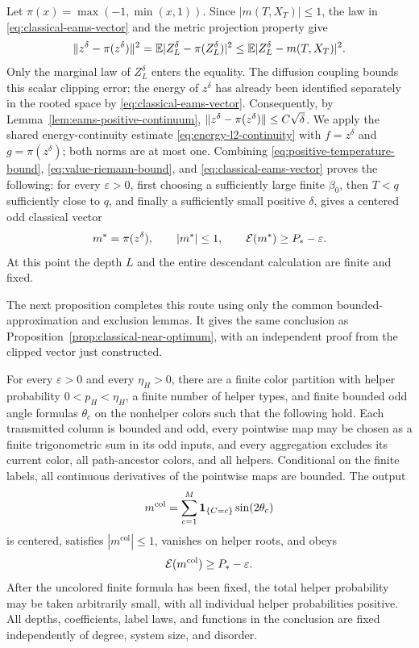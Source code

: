 Let $\pi(x)=\max(-1,\min(x,1))$.  Since $|m(T,X_T)|\le1$,
the law in \eqref{eq:classical-eams-vector} and the metric projection
property give
\[
 \lVert z^\delta-\pi(z^\delta)\rVert^2
 =\mathbb E|Z^\delta_L-\pi(Z^\delta_L)|^2
 \le\mathbb E|Z^\delta_L-m(T,X_T)|^2.
\]
Only the marginal law of $Z^\delta_L$ enters the equality. The
diffusion coupling bounds this scalar clipping error; the energy of
$z^\delta$ has already been identified separately in the rooted space
by \eqref{eq:classical-eams-vector}.
Consequently, by Lemma~\ref{lem:eams-positive-continuum},
$\lVert z^\delta-\pi(z^\delta)\rVert\le C\sqrt\delta$.
We apply the shared energy-continuity estimate
\eqref{eq:energy-l2-continuity} with $f=z^\delta$ and
$g=\pi(z^\delta)$; both norms are at most one.  Combining
\eqref{eq:positive-temperature-bound},
\eqref{eq:value-riemann-bound}, and
\eqref{eq:classical-eams-vector} proves the following: for every
$\varepsilon>0$, first choosing a sufficiently large finite
$\beta_0$, then $T<q$ sufficiently close to $q$, and finally a
sufficiently small positive $\delta$, gives a centered odd classical
vector
\begin{equation}
 m^*=\pi(z^\delta),\qquad |m^*|\le1,
 \qquad \mathcal E(m^*)\ge P_*-\varepsilon.
 \label{eq:clipped-classical-vector}
\end{equation}
At this point the depth $L$ and the entire descendant calculation are
finite and fixed.

The next proposition completes this route using only the common
bounded-approximation and exclusion lemmas.  It gives the same
conclusion as Proposition~\ref{prop:classical-near-optimum}, with an
independent proof from the clipped vector just constructed.

\begin{proposition}
\label{prop:classical-near-optimum-positive-temperature}
For every $\varepsilon>0$ and every $\eta_H>0$, there are a finite
color partition with helper probability $0<p_H<\eta_H$, a finite
number of helper types, and finite bounded odd angle formulas
$\theta_c$ on the nonhelper colors such that the following hold.
Each transmitted column is bounded and odd, every pointwise map
may be chosen as a finite trigonometric sum in its odd inputs, and
every aggregation excludes its current color, all path-ancestor
colors, and all helpers.  Conditional on the finite labels, all
continuous derivatives of the pointwise maps are bounded.  The
output
\begin{equation}
 m^{\mathrm{col}}
  =\sum_{c=1}^M\mathbf 1_{\{C=c\}}\sin(2\theta_c)
 \label{eq:positive-final-classical-formula}
\end{equation}
is centered, satisfies $|m^{\mathrm{col}}|\le1$, vanishes on helper
roots, and obeys
\begin{equation}
 \mathcal E(m^{\mathrm{col}})\ge P_*-\varepsilon.
 \label{eq:positive-final-classical-value}
\end{equation}
After the uncolored finite formula has been fixed, the total helper
probability may be taken arbitrarily small, with all individual
helper probabilities positive.  All depths, coefficients, label laws,
and functions in the conclusion are fixed independently of degree,
system size, and disorder.
\end{proposition}

